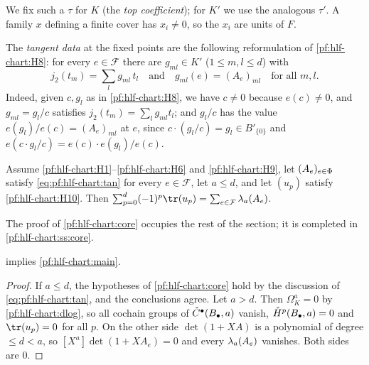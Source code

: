 We fix such a $\tau$ for $K$ (the \emph{top coefficient}); for $K'$ we use the analogous $\tau'$. A family $x$ defining a finite cover has
$x_i\ne0$, so the $x_i$ are units of $F$.

The \emph{tangent data} at the fixed points are the following reformulation of \ref{pf:hlf-chart:H8}: for every $e\in\mathcal F$ there are
$g_{ml}\in K'$ ($1\le m,l\le d$) with
\begin{equation}\label{eq:pf:hlf-chart:tan}
  j_2(t_m)=\sum_{l}g_{ml}\,t_l\quad\text{and}\quad g_{ml}(e)=(A_e)_{ml}\quad\text{for all }m,l .
\end{equation}
Indeed, given $c,g_l$ as in \ref{pf:hlf-chart:H8}, we have $c\ne0$ because $e(c)\ne0$, and $g_{ml}=g_l/c$ satisfies
$j_2(t_m)=\sum_lg_{ml}t_l$; and $g_l/c$ has the value $e(g_l)/e(c)=(A_e)_{ml}$ at $e$, since $c\cdot(g_l/c)=g_l\in B'_{\{0\}}$ and
$e(c\cdot g_l/c)=e(c)\cdot e(g_l)/e(c)$.

\begin{theorem}\label{pf:hlf-chart:core}
Assume \ref{pf:hlf-chart:H1}--\ref{pf:hlf-chart:H6} and \ref{pf:hlf-chart:H9}, let $(A_e)_{e\in\Phi}$ satisfy \eqref{eq:pf:hlf-chart:tan}
for every $e\in\mathcal F$, let $a\le d$, and let $(u_p)$ satisfy \ref{pf:hlf-chart:H10}. Then
$\sum_{p=0}^{d}(-1)^p\tr(u_p)=\sum_{e\in\mathcal F}\hlfcloc_a(A_e)$.
\end{theorem}

The proof of \cref{pf:hlf-chart:core} occupies the rest of the section; it is completed in \cref{pf:hlf-chart:ss:core}.

\begin{lemma}[Reduction]\label{pf:hlf-chart:field0}
 implies \cref{pf:hlf-chart:main}.
\end{lemma}

\begin{proof}
If $a\le d$, the hypotheses of \cref{pf:hlf-chart:core} hold by the discussion of \eqref{eq:pf:hlf-chart:tan}, and the conclusions agree.
Let $a>d$. Then $\Omega^a_K=0$ by \cref{pf:hlf-chart:dlog}, so all cochain groups of $\check{C}^\bullet(B_\bullet,a)$ vanish, $\check{H}^p(B_\bullet,a)=0$
and $\tr(u_p)=0$ for all $p$. On the other side $\det(1+XA)$ is a polynomial of degree $\le d<a$, so $[X^a]\det(1+XA_e)=0$ and every
$\lambda_a(A_e)$ vanishes. Both sides are $0$.
\end{proof}

